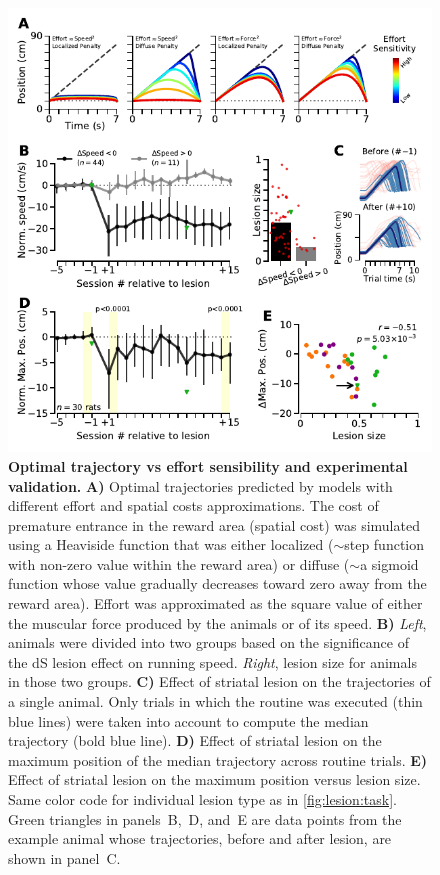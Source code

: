 \begin{figure}[bth!]
	\begin{center}
		\includegraphics[scale=1]{ch-lesion/figures/MaxPosAnalysis.pdf}
		\caption[Optimal Trajectory and Experimental Validation]
		{\textbf{Optimal trajectory vs effort sensibility and experimental validation.}
		\textbf{A)} Optimal trajectories predicted by models with different effort and spatial costs approximations.
		The cost of premature entrance in the reward area (spatial cost) was simulated using a Heaviside function that was either localized ($\sim$step function with non-zero value within the reward area) or diffuse ($\sim$a sigmoid function whose value gradually decreases toward zero away from the reward area).
		Effort was approximated as the square value of either the muscular force produced by the animals or of its speed.
		\textbf{B)} \textit{Left}, animals were divided into two groups based on the significance of the dS lesion effect on running speed.
		\textit{Right}, lesion size for animals in those two groups.
		\textbf{C)} Effect of striatal lesion on the trajectories of a single animal.
		Only trials in which the routine was executed (thin blue lines) were taken into account to compute the median trajectory (bold blue line).
		\textbf{D)} Effect of striatal lesion on the maximum position of the median trajectory across routine trials.
		\textbf{E)} Effect of striatal lesion on the maximum position versus lesion size.
		Same color code for individual lesion type as in \autoref{fig:lesion:task}.
		Green triangles in panels~B,~D, and~E are data points from the example animal whose trajectories, before and after lesion, are shown in panel~C.
		}
		\label{fig:lesion:maxPos}
	\end{center}
\end{figure}
